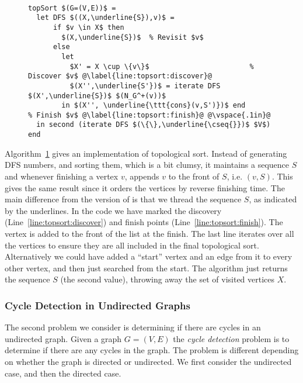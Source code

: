 \begin{figure}
\begin{algorithm}~
\label{alg:topsort}
\begin{lstlisting}
topSort $(G=(V,E))$ = 
  let DFS $((X,\underline{S}),v)$ = 
      if $v \in X$ then
        $(X,\underline{S})$  % Revisit $v$
      else 
        let
          $X' = X \cup \{v\}$                        % Discover $v$ @\label{line:topsort:discover}@
          $(X'',\underline{S'})$ = iterate DFS $(X',\underline{S})$ $(N_G^+(v))$ 
        in $(X'', \underline{\ttt{cons}(v,S')})$ end                 % Finish $v$ @\label{line:topsort:finish}@ @\vspace{.1in}@
  in second (iterate DFS $(\{\},\underline{\cseq{}})$ $V$) end
\end{lstlisting}
\end{algorithm}
\end{figure}

Algorithm~\ref{alg:topsort} gives an implementation of topological
sort.  Instead of generating DFS numbers, and sorting them, which is a
bit clumsy, it maintains a sequence $S$ and whenever finishing a
vertex $v$, appends $v$ to the front of $S$, i.e. $(v,S)$.
This gives the same result since it orders the vertices by reverse
finishing time.  The main difference from the 
version of \dfs{} is that we thread the sequence $S$, as indicated by
the underlines.  In the code we have marked the discovery
(Line~\ref{line:topsort:discover}) and finish points
(Line~\ref{line:topsort:finish}).  The vertex is added to the front of
the list at the finish.  
%
The last line iterates over all the vertices
to ensure they are all included in the final topological sort.
%
Alternatively we could have added a ``start'' vertex and an edge from
it to every other vertex, and then just searched from the start.  The
algorithm just returns the sequence $S$ (the second value), throwing
away the set of visited vertices $X$.

\subsubsection{Cycle Detection in Undirected Graphs}

The second problem we consider is determining if there are cycles
in an undirected graph.   Given a graph $G =
(V, E)$ the  \emph{cycle detection} problem is to determine if there are
any cycles in the graph.  The problem is different depending on
whether the graph is directed or undirected.  We first consider
the undirected case, and then the directed case.

